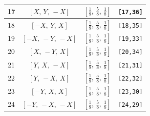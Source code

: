 \documentclass[fleqn,8pt]{jsarticle}
\begin{document}
\begin{longtable}{cccc}
17 & $\left[ X,\, Y,\, - X \right]$ & $\left[ \frac{1}{8},\, \frac{5}{8},\, \frac{1}{8} \right]$ & {\tt [17,36]} \\ \hline
18 & $\left[ - X,\, Y,\, X \right]$ & $\left[ \frac{1}{8},\, \frac{5}{8},\, \frac{1}{8} \right]$ & {\tt [18,35]} \\ \hline
19 & $\left[ - X,\, - Y,\, - X \right]$ & $\left[ \frac{1}{8},\, \frac{5}{8},\, \frac{1}{8} \right]$ & {\tt [19,33]} \\ \hline
20 & $\left[ X,\, - Y,\, X \right]$ & $\left[ \frac{1}{8},\, \frac{5}{8},\, \frac{1}{8} \right]$ & {\tt [20,34]} \\ \hline
21 & $\left[ Y,\, X,\, - X \right]$ & $\left[ \frac{1}{8},\, \frac{5}{8},\, \frac{1}{8} \right]$ & {\tt [21,31]} \\ \hline
22 & $\left[ Y,\, - X,\, X \right]$ & $\left[ \frac{1}{8},\, \frac{5}{8},\, \frac{1}{8} \right]$ & {\tt [22,32]} \\ \hline
23 & $\left[ - Y,\, X,\, X \right]$ & $\left[ \frac{1}{8},\, \frac{5}{8},\, \frac{1}{8} \right]$ & {\tt [23,30]} \\ \hline
24 & $\left[ - Y,\, - X,\, - X \right]$ & $\left[ \frac{1}{8},\, \frac{5}{8},\, \frac{1}{8} \right]$ & {\tt [24,29]} \\
\end{longtable}
\renewcommand{\arraystretch}{1.2}
\end{document}
